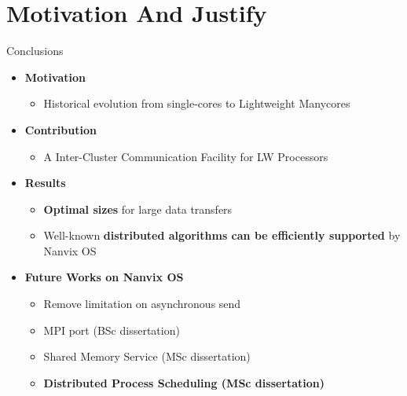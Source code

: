 \section{Motivation And Justify}

	\begin{frame}[fragile]{Conclusions}
		\begin{itemize}
			\item \textbf{Motivation}
			\begin{itemize}
				\item Historical evolution from single-cores to Lightweight Manycores
			\end{itemize}
		\end{itemize}

		\begin{itemize}
			\item \textbf{Contribution}
			\begin{itemize}
				\item A Inter-Cluster Communication Facility for LW Processors
			\end{itemize}
		\end{itemize}

		\begin{itemize}
			\item \textbf{Results}
			\begin{itemize}
				\item \textbf{Optimal sizes} for large data transfers
				\item Well-known \textbf{distributed algorithms can be efficiently supported} by Nanvix OS
			\end{itemize}
		\end{itemize}


		\begin{itemize}
			\item \textbf{Future Works on Nanvix OS}
			\begin{itemize}
				\item Remove limitation on asynchronous send
				\item MPI port (BSc dissertation)
				\item Shared Memory Service (MSc dissertation)
				\item \textbf{Distributed Process Scheduling (MSc dissertation)}
			\end{itemize}
		\end{itemize}

		
	\end{frame}

